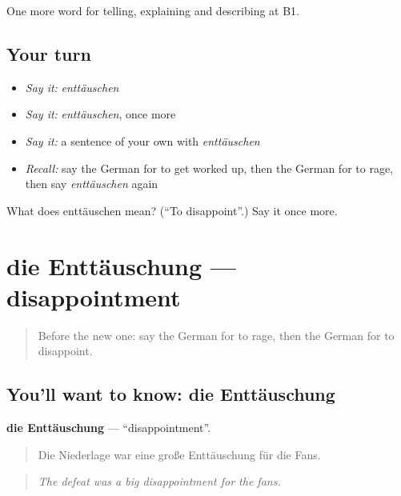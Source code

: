 \begin{grammarlens}[title={What you've built}]
One more word for telling, explaining and describing at B1.
\end{grammarlens}

\subsection*{Your turn}
\begin{itemize}
\raggedright
  \item \emph{Say it:} \emph{enttäuschen}
  \item \emph{Say it:} \emph{enttäuschen}, once more
  \item \emph{Say it:} a sentence of your own with \emph{enttäuschen}
  \item \emph{Recall:} say the German for to get worked up, then the German for to rage, then say \emph{enttäuschen} again
\end{itemize}

\begin{tcolorbox}[breakable,colback=teal!4,colframe=teal!35!black,title={Before you move on}]
What does enttäuschen mean? (\textquotedblleft{}To disappoint\textquotedblright{}.) Say it once more.
\end{tcolorbox}
\section[die Enttäuschung]{die Enttäuschung — disappointment}

\label{lesson:GE-C469-enttaeuschung}



\begin{quote}
Before the new one: say the German for to rage, then the German for to disappoint.
\end{quote}

\subsection*{You'll want to know: die Enttäuschung}
\textbf{die Enttäuschung} — \textquotedblleft{}disappointment\textquotedblright{}.

\begin{quote}
Die Niederlage war eine große Enttäuschung für die Fans.
\end{quote}

\begin{quote}
\emph{The defeat was a big disappointment for the fans.}
\end{quote}

